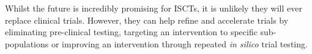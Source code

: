 \documentclass{article}
\begin{document}
Whilst the future is incredibly promising for ISCTs, it is unlikely they will ever replace clinical trials. However, they can help refine and accelerate trials by eliminating pre-clinical testing, targeting an intervention to specific sub-populations or improving an intervention through repeated \textit{in silico} trial testing.


{}
\end{document}

